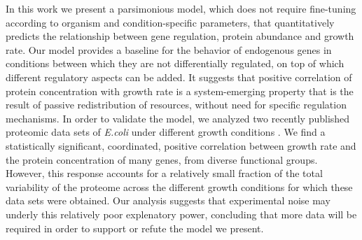 In this work we present a parsimonious model, which does not require fine-tuning according to organism and condition-specific parameters, that quantitatively predicts the relationship between gene regulation, protein abundance and growth rate.
Our model provides a baseline for the behavior of endogenous genes in conditions between which they are not differentially regulated, on top of which different regulatory aspects can be added.
It suggests that positive correlation of protein concentration with growth rate is a system-emerging property that is the result of passive redistribution of resources, without need for specific regulation mechanisms.
In order to validate the model, we analyzed two recently published proteomic data sets of \emph{E.coli} under different growth conditions \cite{Valgepea2013, Heinemann2014}.
We find a statistically significant, coordinated, positive correlation between growth rate and the protein concentration of many genes, from diverse functional groups.
However, this response accounts for a relatively small fraction of the total variability of the proteome across the different growth conditions for which these data sets were obtained.
Our analysis suggests that experimental noise may underly this relatively poor explenatory power, concluding that more data will be required in order to support or refute the model we present.
